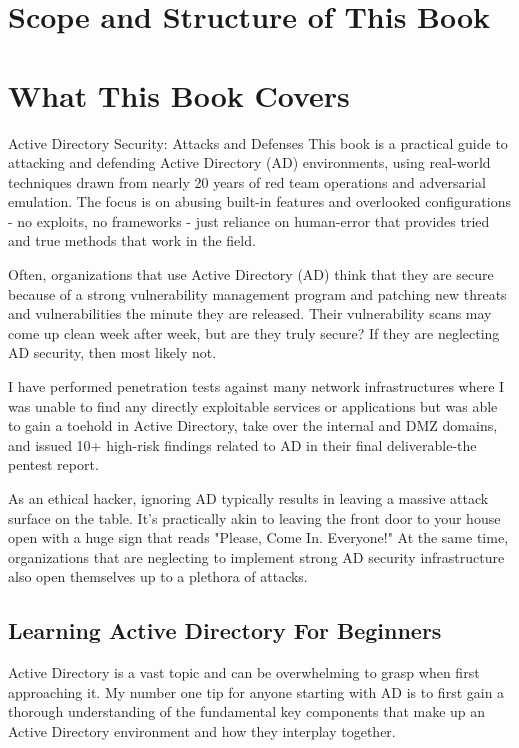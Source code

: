 %
%
%
\chapter{Scope and Structure of This Book}
\label{intro-whatthisbookisabout} %

\chapter{What This Book Covers}

Active Directory Security: Attacks and Defenses
This book is a practical guide to attacking and defending Active Directory (AD) environments, using real-world techniques drawn from nearly 20 years of red team operations and adversarial emulation. The focus is on abusing built-in features and overlooked configurations - no exploits, no frameworks - just reliance on human-error that provides tried and true methods that work in the field.

Often, organizations that use Active Directory (AD) think that they are secure because of a strong vulnerability management program and patching new threats and vulnerabilities the minute they are released. Their vulnerability scans may come up clean week after week, but are they truly secure? If they are neglecting AD security, then most likely not.

I have performed penetration tests against many network infrastructures where I was unable to find any directly exploitable services or applications but was able to gain a toehold in Active Directory, take over the internal and DMZ domains, and issued 10+ high-risk findings related to AD in their final deliverable-the pentest report.

As an ethical hacker, ignoring AD typically results in leaving a massive attack surface on the table. It's practically akin to leaving the front door to your house open with a huge sign that reads "Please, Come In. Everyone!" At the same time, organizations that are neglecting to implement strong AD security infrastructure also open themselves up to a plethora of attacks.

\section{Learning Active Directory For Beginners}
Active Directory is a vast topic and can be overwhelming to grasp when first approaching it. My number one tip for anyone starting with AD is to first gain a thorough understanding of the fundamental key components that make up an Active Directory environment and how they interplay together.

